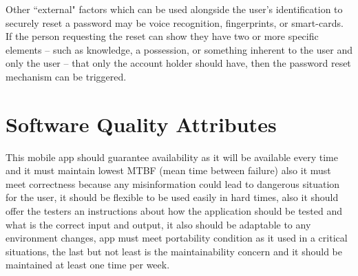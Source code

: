\documentclass{scrreprt}
\begin{document}
Other ``external" factors which can be used alongside the user’s identification to securely reset a password may be voice recognition, fingerprints, or smart-cards. If the person requesting the reset can show they have two or more specific elements – such as knowledge, a possession, or something inherent to the user and only the user – that only the account holder should have, then the password reset mechanism can be triggered.

\section{Software Quality Attributes}
This mobile app should guarantee availability as it will be available every time and it must maintain lowest MTBF (mean time between failure) also it must meet correctness because any misinformation could lead to dangerous situation for the user, it should be flexible to be used easily in hard times, also it should offer the testers an instructions about how the application should be tested and what is the correct input and output, it also should be adaptable to any environment changes, app must meet portability condition as it used in a critical situations, the last but not least is the maintainability concern and it should be maintained at least one time per week.




\end{document}
